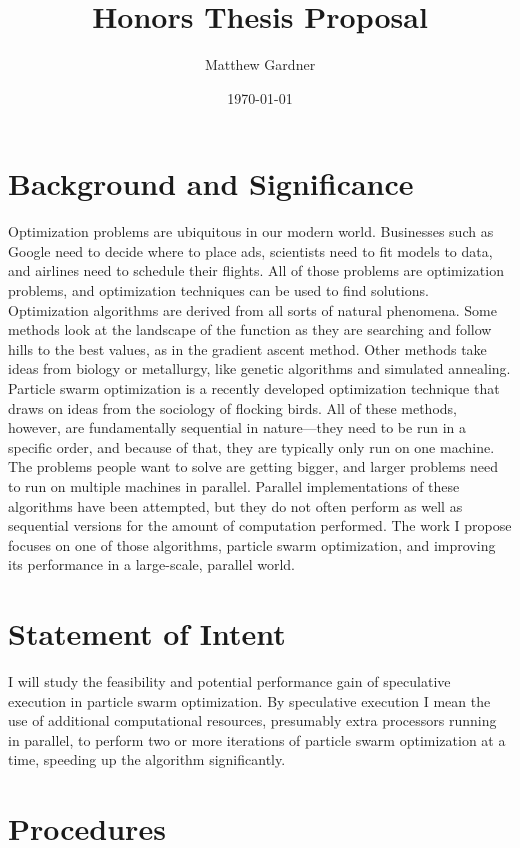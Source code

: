 \documentclass[onecolumn, 12pt]{article}
\title{Honors Thesis Proposal}
\author{Matthew Gardner}
\date{\today}
\begin{document}
\maketitle

\section{Background and Significance}

Optimization problems are ubiquitous in our modern world.  Businesses such as
Google need to decide where to place ads, scientists need to fit models to
data, and airlines need to schedule their flights.  All of those problems are
optimization problems, and optimization techniques can be used to find
solutions.  Optimization algorithms are derived from all sorts of natural
phenomena.  Some methods look at the landscape of the function as they are
searching and follow hills to the best values, as in the gradient ascent
method.  Other methods take ideas from biology or metallurgy, like genetic
algorithms and simulated annealing.  Particle swarm optimization is a recently
developed optimization technique that draws on ideas from the sociology of
flocking birds.  All of these methods, however, are fundamentally sequential in
nature---they need to be run in a specific order, and because of that, they are
typically only run on one machine.  The problems people want to solve are
getting bigger, and larger problems need to run on multiple machines in
parallel.  Parallel implementations of these algorithms have been attempted,
but they do not often perform as well as sequential versions for the amount of
computation performed.  The work I propose focuses on one of those algorithms,
particle swarm optimization, and improving its performance in a large-scale,
parallel world.

\section{Statement of Intent}

I will study the feasibility and potential performance gain of speculative
execution in particle swarm optimization.  By speculative execution I mean the
use of additional computational resources, presumably extra processors running
in parallel, to perform two or more iterations of particle swarm optimization
at a time, speeding up the algorithm significantly.

\section{Procedures}
\end{document}

